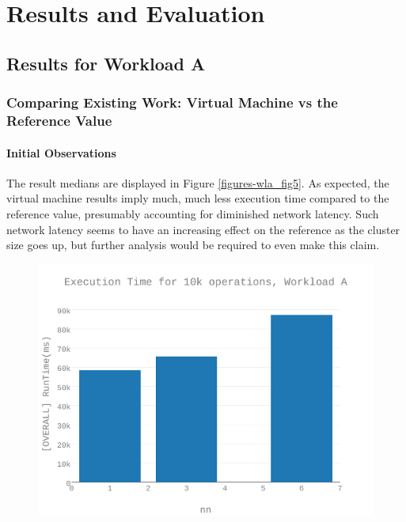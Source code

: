 

\chapter{Results and Evaluation}
\section{Results for Workload A}
\subsection{Comparing Existing Work: Virtual Machine vs the Reference Value}
\subsubsection{Initial Observations}
The result medians are displayed in Figure \ref{figures-wla_fig5}.  As expected, the virtual machine results imply much, much less execution time compared to the reference value, presumably accounting for diminished network latency. Such network latency seems to have an increasing effect on the reference as the cluster size goes up, but further analysis would be required to even make this claim. \begin{figure}[h]
\includegraphics[width=5.5in]{Figures/figures-wla_fig1.pdf}
\caption{}
\label{figures-wla_fig1}
\end{figure}

